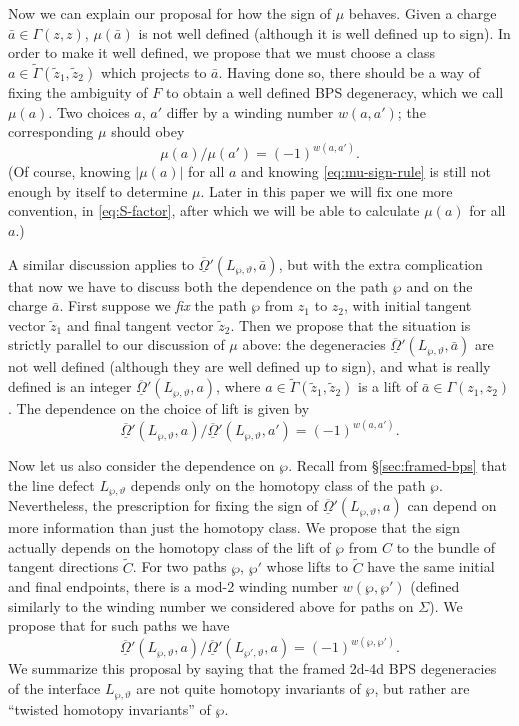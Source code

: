 \documentclass[11pt,a4paper]{article}
\def\tz{{\tilde z}}
\newcommand{\abs}[1]{\lvert#1\rvert}
\newcommand{\tGamma}{\tilde\Gamma}
\newcommand{\ti}[1]{\textit{#1}}
\newcommand\fro{{\overline{\underline{\Omega}}}}
\begin{document}
Now we can explain our proposal for how the sign of $\mu$ behaves.  Given a charge $\bar a \in \Gamma(z,z)$,
$\mu(\bar{a})$ is not well defined (although it is well defined up to sign).
In order to make it well defined, we propose that we must choose a class
$a \in \tGamma(\tz_1,\tz_2)$ which projects to $\bar a$.  Having done so,
there should be a way of fixing the ambiguity of $F$ to obtain a well defined
BPS degeneracy, which we call $\mu(a)$.
Two choices $a$, $a'$ differ by a winding number $w(a,a')$;
the corresponding $\mu$ should obey
\begin{equation} \label{eq:mu-sign-rule}
 \mu(a) / \mu(a')  = (-1)^{w(a,a')}.
\end{equation}
(Of course, knowing $\abs{\mu(a)}$ for all $a$ and knowing \eqref{eq:mu-sign-rule} is still not enough by itself to determine $\mu$.
Later in this paper we will fix one more convention, in \eqref{eq:S-factor},  after which we
will be able to calculate $\mu(a)$ for all $a$.)

A similar discussion applies to $\fro'(L_{\wp,\vartheta}, \bar a)$, but with the extra complication
that now we have to discuss both the dependence on the path $\wp$ and on the charge $\bar a$.
First suppose we \ti{fix} the path $\wp$ from $z_1$ to $z_2$, with initial tangent vector $\tz_1$
and final tangent vector $\tz_2$.  Then we propose that the situation is strictly parallel
to our discussion of $\mu$ above:
the degeneracies $\fro'(L_{\wp,\vartheta}, \bar a)$ are not well defined (although they are well
defined up to sign), and
what is really defined is an integer $\fro'(L_{\wp,\vartheta}, a)$, where $a \in \tGamma(\tz_1,\tz_2)$
is a lift of $\bar a \in \Gamma(z_1,z_2)$.  The dependence on the choice of lift is given by
\begin{equation} \label{eq:winding-rule-1}
\fro'(L_{\wp,\vartheta}, a) / \fro'(L_{\wp,\vartheta}, a') = (-1)^{w(a,a')}.
\end{equation}

Now let us also consider the dependence on $\wp$.
Recall from \S \ref{sec:framed-bps} that the line defect $L_{\wp, \vartheta}$ depends only on the
homotopy class of the path $\wp$. Nevertheless,
 the prescription for fixing the sign of $\fro'(L_{\wp,\vartheta},a)$ can depend on
more information than just the homotopy class.  We propose that the sign actually depends on
the homotopy class of the lift of $\wp$ from $C$ to the bundle of tangent directions $\tilde{C}$.
For two paths $\wp$, $\wp'$ whose lifts to $\tilde{C}$
have the same initial and final endpoints, there is a mod-2
winding number $w(\wp,\wp')$ (defined similarly to the winding number we considered above for paths on $\Sigma$).
We propose that for such paths we have
\begin{equation}
\fro'(L_{\wp,\vartheta},a) / \fro'(L_{\wp',\vartheta},a) = (-1)^{w(\wp,\wp')}.
\end{equation}
We summarize this proposal by saying that the framed 2d-4d BPS degeneracies of the
interface $L_{\wp,\vartheta}$ are not quite homotopy invariants of $\wp$, but rather are
``twisted homotopy invariants'' of $\wp$.
\end{document}
